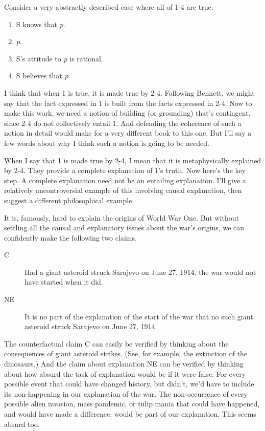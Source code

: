 \documentclass[
  12pt,
  letterpaper,
]{scrbook}
\providecommand{\tightlist}{%
  \setlength{\itemsep}{0pt}\setlength{\parskip}{0pt}}\usepackage{longtable,booktabs,array}
\begin{document}
Consider a very abstractly described case where all of 1-4 are true.

\begin{enumerate}
\def\labelenumi{\arabic{enumi}.}
\tightlist
\item
  S knows that \emph{p}.
\item
  \emph{p}.
\item
  S's attitude to \emph{p} is rational.
\item
  S believes that \emph{p}.
\end{enumerate}

I think that when 1 is true, it is made true by 2-4. Following Bennett,
we might say that the fact expressed in 1 is built from the facts
expressed in 2-4. Now to make this work, we need a notion of building
(or grounding) that's contingent, since 2-4 do not collectively entail
1. And defending the coherence of such a notion in detail would make for
a very different book to this one. But I'll say a few words about why I
think such a notion is going to be needed.

When I say that 1 is made true by 2-4, I mean that it is metaphysically
explained by 2-4. They provide a complete explanation of 1's truth. Now
here's the key step. A complete explanation need not be an entailing
explanation. I'll give a relatively uncontroversial example of this
involving causal explanation, then suggest a different philosophical
example.

It is, famously, hard to explain the origins of World War One. But
without settling all the causal and explanatory issues about the war's
origins, we can confidently make the following two claims.

\begin{description}
\item[C]
Had a giant asteroid struck Sarajevo on June 27, 1914, the war would not
have started when it did.
\item[NE]
It is no part of the explanation of the start of the war that no such
giant asteroid struck Sarajevo on June 27, 1914.
\end{description}

The counterfactual claim C can easily be verified by thinking about the
consequences of giant asteroid strikes. (See, for example, the
extinction of the dinosaurs.) And the claim about explanation NE can be
verified by thinking about how absurd the task of explanation would be
if it were false. For every possible event that could have changed
history, but didn't, we'd have to include its non-happening in our
explanation of the war. The non-occurrence of every possible alien
invasion, mass pandemic, or tulip mania that could have happened, and
would have made a difference, would be part of our explanation. This
seems absurd too.
\end{document}
